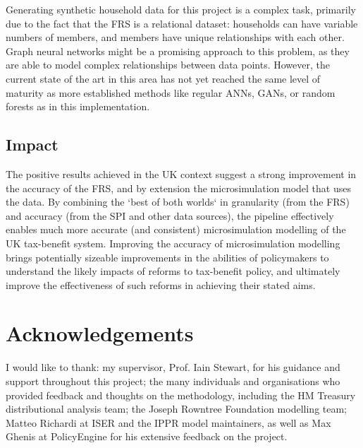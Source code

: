 \documentclass[10pt,journal,compsoc]{IEEEtran}
\begin{document}
Generating synthetic household data for this project is a complex task, primarily due to the fact that the FRS is a relational dataset: households can have variable numbers of members, and members have unique relationships with each other. Graph neural networks might be a promising approach to this problem, as they are able to model complex relationships between data points. However, the current state of the art in this area has not yet reached the same level of maturity as more established methods like regular ANNs, GANs, or random forests as in this implementation.



\subsection{Impact}

The positive results achieved in the UK context suggest a strong improvement in the accuracy of the FRS, and by extension the microsimulation model that uses the data. By combining the `best of both worlds` in granularity (from the FRS) and accuracy (from the SPI and other data sources), the pipeline effectively enables much more accurate (and consistent) microsimulation modelling of the UK tax-benefit system. Improving the accuracy of microsimulation modelling brings potentially sizeable improvements in the abilities of policymakers to understand the likely impacts of reforms to tax-benefit policy, and ultimately improve the effectiveness of such reforms in achieving their stated aims.

\section*{Acknowledgements}

I would like to thank: my supervisor, Prof. Iain Stewart, for his guidance and support throughout this project; the many individuals and organisations who provided feedback and thoughts on the methodology, including the HM Treasury distributional analysis team; the Joseph Rowntree Foundation modelling team; Matteo Richardi at ISER and the IPPR model maintainers, as well as Max Ghenis at PolicyEngine for his extensive feedback on the project.

\end{document}
